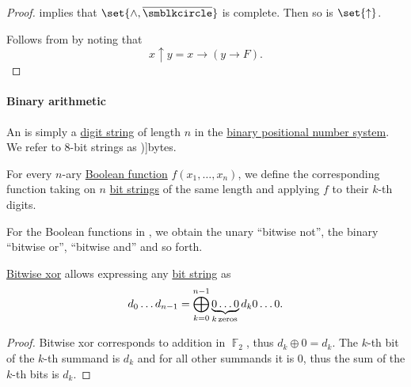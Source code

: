 \begin{proof}
   implies that \( \set{ \wedge, \oline{\anon} } \) is complete. Then so is \( \set{ \uparrow } \).

   Follows from  by noting that
  \begin{equation*}
    x \uparrow y = x \rightarrow (y \rightarrow F).
  \end{equation*}
\end{proof}

\paragraph{Binary arithmetic}

\begin{definition}\label{def:bit_string}\mimprovised
  An  is simply a \hyperref[def:positional_number_system/digit]{digit string} of length \( n \) in the \hyperref[def:positional_number_system/binary]{binary positional number system}. We refer to \( 8 \)-bit strings as \term[en=byte (\cite[50]{Cohen1981Endianness})]{bytes}.
\end{definition}

\begin{definition}\label{def:bitwise_operations}
  For every \( n \)-ary \hyperref[def:boolean_function]{Boolean function} \( f(x_1, \ldots, x_n) \), we define the corresponding  function taking on \( n \) \hyperref[def:bit_string]{bit strings} of the same length and applying \( f \) to their \( k \)-th digits.
\end{definition}
\begin{comments}
  \item For the Boolean functions in , we obtain the unary \enquote{bitwise not}, the binary \enquote{bitwise or}, \enquote{bitwise and} and so forth.
\end{comments}

\begin{proposition}\label{thm:disjoint_sum_via_bitwise_xor}
  \hyperref[def:bitwise_operations]{Bitwise xor} allows expressing any \hyperref[def:bit_string]{bit string} as
  \begin{equation*}
    d_0 \ldots d_{n-1} = \bigoplus_{k=0}^{n-1} \underbrace{0 \ldots 0}_{k \T*{zeros}} d_k 0 \ldots 0.
  \end{equation*}
\end{proposition}
\begin{proof}
  Bitwise xor corresponds to addition in \( \BbbF_2 \), thus \( d_k \oplus 0 = d_k \). The \( k \)-th bit of the \( k \)-th summand is \( d_k \) and for all other summands it is \( 0 \), thus the sum of the \( k \)-th bits is \( d_k \).
\end{proof}

